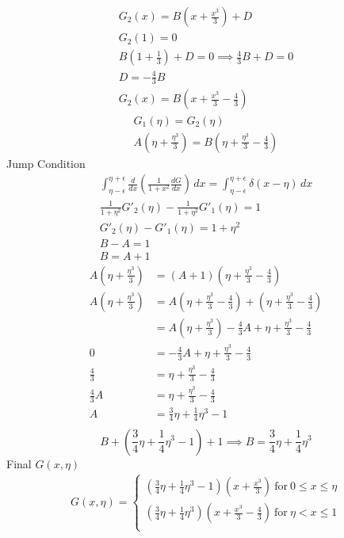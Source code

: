 \documentclass[letterpaper,11pt]{article}
\begin{document}
    \begin{gather*}
        G_2(x) = B(x+\frac{x^3}{3})+D\\
        G_2(1) = 0\\
        B(1+\frac{1}{3}) + D = 0 \implies \frac{4}{3} B + D =0\\
        D = - \frac{4}{3}B\\
        G_2(x) = B(x+\frac{x^3}{3}-\frac{4}{3})
    \end{gather*}
    \begin{gather*}
        G_1(\eta) = G_2(\eta)\\
        A(\eta + \frac{\eta^3}{3}) = B(\eta+\frac{\eta^3}{3} - \frac{4}{3})
    \end{gather*}
    Jump Condition
    \begin{gather*}
        \int_{\eta-\epsilon}^{\eta+\epsilon} \frac{d}{dx} \left(\frac{1}{1+x^2}\frac{dG}{dx} \right) \,dx = \int_{\eta-\epsilon}^{\eta+\epsilon} \delta(x-\eta) \, dx\\
        \frac{1}{1+\eta^2} G'_2(\eta) - \frac{1}{1+\eta^2} G'_1(\eta) = 1\\
        G'_2(\eta) - G'_1(\eta) = 1+\eta^2\\
        B-A = 1\\
        B = A+1
    \end{gather*}
    \begin{align*}
        A(\eta + \frac{\eta^3}{3}) &= (A+1)(\eta + \frac{\eta^3}{3} - \frac{4}{3})\\
        A(\eta + \frac{\eta^3}{3}) &= A(\eta + \frac{\eta^3}{3} - \frac{4}{3}) + (\eta + \frac{\eta^3}{3}-\frac{4}{3})\\
        & = A(\eta + \frac{\eta^3}{3}) - \frac{4}{3} A + \eta + \frac{\eta^3}{3} -\frac{4}{3}\\
        0&= - \frac{4}{3} A + \eta + \frac{\eta^3}{3} - \frac{4}{3}\\
        \frac{4}{3} &= \eta + \frac{\eta^3}{3} -\frac{4}{3}\\
        \frac{4}{3} A &= \eta + \frac{\eta^3}{3} -\frac{4}{3}\\
        A &= \frac{3}{4}\eta + \frac{1}{4}\eta^3 - 1\\
    \end{align*}
    \[
        B + \left(\frac{3}{4} \eta + \frac{1}{4}\eta^3 -1\right) +1 \implies B = \frac{3}{4}\eta + \frac{1}{4}\eta^3
    \]
    Final $G(x,\eta)$\\
    \begin{gather*}
        G(x,\eta) = \begin{cases}
                        \left(\frac{3}{4} \eta + \frac{1}{4} \eta^3 -1\right) \left(x + \frac{x^3}{3}\right) \ \text{for} \ 0 \leq x \leq \eta\\
                        \left(\frac{3}{4} \eta + \frac{1}{4} \eta^3 \right)\left(x+\frac{x^3}{3}-\frac{4}{3}\right)\ \text{for} \ \eta < x \leq 1\\
        \end{cases}
    \end{gather*}
\end{document}
